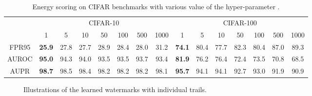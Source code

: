 \documentclass{article}
\begin{document}
\begin{table}[t]
\centering
\caption{{Energy scoring on CIFAR benchmarks with various value of the hyper-parameter .}} \label{tab: energy t}
\scriptsize{
\begin{tabular}{c|ccccccc|ccccccc} 
\toprule[1.5pt]
\multirow{2}{*}{} & \multicolumn{7}{c|}{CIFAR-10}                                   & \multicolumn{7}{c}{CIFAR-100}      \\
\cline{2-15}
                   & 1              & 5     & 10    & 50    & 100   & 500   & 1000  & 1 & 5 & 10 & 50 & 100 & 500 & 1000 \\
\midrule[1pt]
FPR95              & \textbf{25.9} & 27.8 & 27.7 & 28.9 & 28.4 & 28.0 & 31.2 & \textbf{74.1}  & 80.4 & 77.7 & 82.3 & 80.4 & 87.0 & 89.3 \\
AUROC              & \textbf{95.0} & 94.3 & 94.0 & 93.5 & 93.5 & 93.7 & 93.4 & \textbf{81.9}  & 76.2 & 76.4 & 72.4 & 73.5 & 70.8 & 68.5 \\
AUPR               & \textbf{98.7} & 98.5 & 98.4 & 98.2 & 98.2 & 98.2 & 98.1 & \textbf{95.7}  & 94.1 & 94.1 & 92.7 & 93.0 & 91.9 & 90.9 \\
\bottomrule[1.5pt]
\end{tabular}}
\end{table}

\begin{figure*}[!htp]
\centering  
{} 




\caption{Illustrations of the learned watermarks with  individual trails.} \label{fig: f}
\end{figure*}
\end{document}
